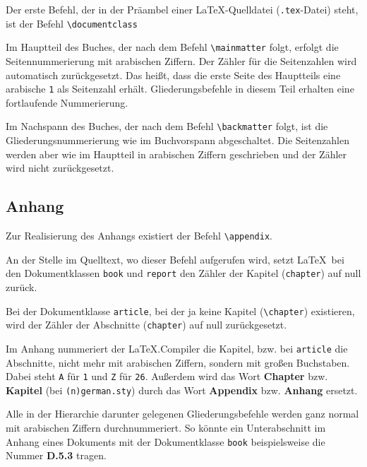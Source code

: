 Der erste Befehl, der in der Präambel einer \LaTeX-Quelldatei (\verb!.tex!-Datei) steht, ist der Befehl \verb!\documentclass!
\begin{document}

Im Hauptteil des Buches, der nach dem Befehl \verb!\mainmatter! 
folgt, erfolgt die Seitennummerierung
mit arabischen Ziffern. Der Zähler für die Seitenzahlen wird automatisch
zurückgesetzt. Das heißt, dass die erste Seite des Hauptteils eine arabische 
\verb!1! als Seitenzahl erhält. Gliederungsbefehle in diesem Teil erhalten eine
fortlaufende Nummerierung. 


Im Nachspann des Buches, der nach dem Befehl \verb!\backmatter! 
folgt, ist die Gliederungsnummerierung wie im Buchvorspann
abgeschaltet. Die Seitenzahlen werden aber wie im Hauptteil
in arabischen Ziffern geschrieben und der Zähler wird nicht zurückgesetzt.



\subsection{Anhang}

Zur Realisierung des Anhangs existiert der 
Befehl \verb!\appendix!.


An der Stelle im Quelltext, wo dieser Befehl aufgerufen wird, setzt \LaTeX\ 
bei den Dokumentklassen \verb!book! und \verb!report! den Zähler der Kapitel (\verb!chapter!) auf null zurück. 

Bei der Dokumentklasse \verb!article!, bei der ja keine Kapitel 
(\texttt{\textbackslash chapter}) existieren, wird der Zähler der Abschnitte
(\verb!chapter!) auf null zurückgesetzt. 

Im Anhang nummeriert der \LaTeX.Compiler die Kapitel, bzw. bei \verb!article! die Abschnitte, nicht mehr mit arabischen Ziffern, sondern mit großen Buchstaben. Dabei steht
\verb!A! für \verb!1!  und \verb!Z! für \verb!26!. Außerdem wird das Wort
\textbf{Chapter} bzw. \textbf{Kapitel} (bei \texttt{(n)german.sty}) durch das Wort 
\textbf{Appendix} bzw. \textbf{Anhang} ersetzt.

Alle in der Hierarchie darunter gelegenen Gliederungsbefehle werden ganz normal
mit arabischen Ziffern durchnummeriert. So könnte ein Unterabschnitt im Anhang
eines Dokuments mit der Dokumentklasse \verb!book! beispielsweise die
Nummer \textbf{D.5.3} tragen.
\end{document}
